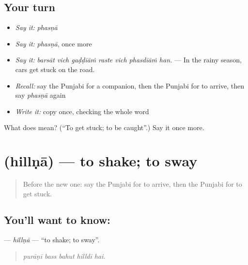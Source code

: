 \subsection*{Your turn}
\begin{itemize}
\raggedright
  \item \emph{Say it:} \emph{phasṇā}
  \item \emph{Say it:} \emph{phasṇā}, once more
  \item \emph{Say it:} \emph{barsāt vich gaḍḍīāṁ raste vich phasdīāṁ han.} — In the rainy season, cars get stuck on the road.
  \item \emph{Recall:} say the Punjabi for a companion, then the Punjabi for to arrive, then say \emph{phasṇā} again
  \item \emph{Write it:} copy \textbf{} once, checking the whole word
\end{itemize}

\begin{tcolorbox}[breakable,colback=teal!4,colframe=teal!35!black,title={Before you move on}]
What does  mean? (\textquotedblleft{}To get stuck; to be caught\textquotedblright{}.) Say it once more.
\end{tcolorbox}
\section[\texorpdfstring{\pa{ਹਿੱਲਣਾ} (hillṇā)}{ਹਿੱਲਣਾ (hillṇā)}]{ (hillṇā) — to shake; to sway}

\label{lesson:PA-C283-hillna}



\begin{quote}
Before the new one: say the Punjabi for to arrive, then the Punjabi for to get stuck.
\end{quote}

\subsection*{You'll want to know: }
\textbf{} — \emph{hillṇā} — \textquotedblleft{}to shake; to sway\textquotedblright{}.

\begin{quote}
    
\end{quote}

\begin{quote}
\emph{purāṇī bass bahut hilldī hai.}
\end{quote}

